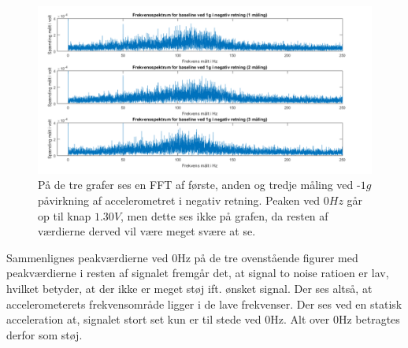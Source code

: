 \begin{figure}[H]
	\centering
	\includegraphics[scale=0.5]{figures/cProblemloesning/Pilotforsoeg_FrekvensN.png}
	\caption{På de tre grafer ses en FFT af første, anden og tredje måling ved -$1g$ påvirkning af accelerometret i negativ retning. Peaken ved $0Hz$ går op til knap $1.30V$, men dette ses ikke på grafen, da resten af værdierne derved vil være meget svære at se.}
	\label{Fig:Pilot_FFTN}
\end{figure}

\noindent Sammenlignes peakværdierne ved $0$Hz på de tre ovenstående figurer med peakværdierne i resten af signalet fremgår det, at signal to noise ratioen er lav, hvilket betyder, at der ikke er meget støj ift. ønsket signal. Der ses altså, at accelerometerets frekvensområde ligger i de lave frekvenser. Der ses ved en statisk acceleration at, signalet stort set kun er til stede ved $0$Hz. Alt over $0$Hz betragtes derfor som støj. 

